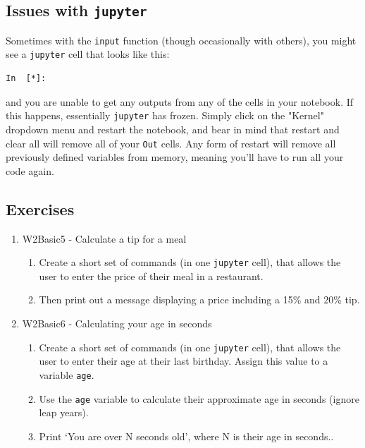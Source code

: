 
\subsection{Issues with \texttt{jupyter}}
Sometimes with the \texttt{input} function (though occasionally with others), you might see a \texttt{jupyter} cell that looks like this:
\begin{lstlisting}[style=PY] 
    In  [*]:
\end{lstlisting}

\noindent and you are unable to get any outputs from any of the cells in your notebook. If this happens, essentially \texttt{jupyter} has frozen. Simply click on the "Kernel" dropdown menu and restart the notebook, and bear in mind that restart and clear all will remove all of your \texttt{Out} cells. Any form of restart will remove all previously defined variables from memory, meaning you'll have to run all your code again.
\subsection{Exercises}

\begin{enumerate}
\item W2Basic5 - Calculate a tip for a meal
    \begin{enumerate}
      \item Create a short set of commands (in one \texttt{jupyter} cell), that allows the user to enter the price of their meal in a restaurant.
      \item Then print out a message displaying a price including a 15\% and 20\% tip.
    \end{enumerate}

\item W2Basic6 - Calculating your age in seconds
    \begin{enumerate}
      \item Create a short set of commands (in one \texttt{jupyter} cell), that allows the user to enter their age at their last birthday. Assign this value to a variable \texttt{age}.
      \item Use the \texttt{age} variable to calculate their approximate age in seconds (ignore leap years).
      \item Print `You are over N seconds old', where N is their age in seconds..
    \end{enumerate}
\end{enumerate}

